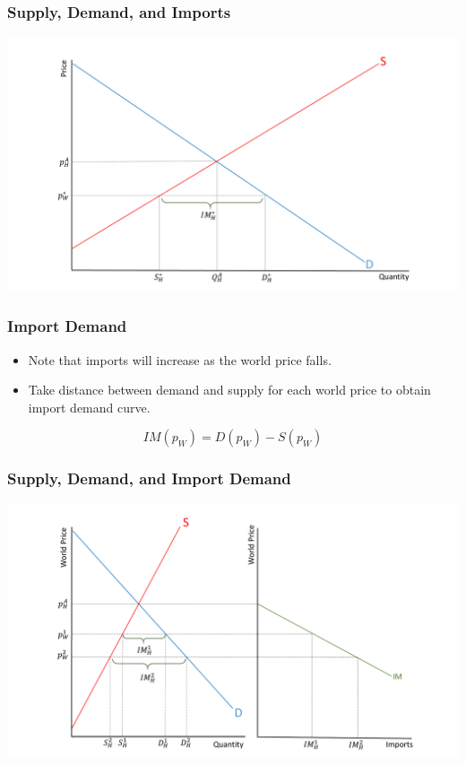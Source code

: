 \documentclass{beamer}
\begin{document}
\begin{frame}
	\frametitle{Supply, Demand, and Imports}
	\includegraphics[scale=0.3]{SL_extra1.pdf}
\end{frame}

\begin{frame}
\frametitle{Import Demand}
	\begin{itemize}
		\item Note that imports will increase as the world price falls.
		\item Take distance between demand and supply for each world price to obtain import demand curve.
		\end{itemize}
\begin{equation}
IM(p_W)=D(p_W)-S(p_W) \nonumber
\end{equation}
	
\end{frame}


\begin{frame}
	\frametitle{Supply, Demand, and Import Demand}
	\includegraphics[scale=0.3]{SL_5.pdf}
\end{frame}
\end{document}
